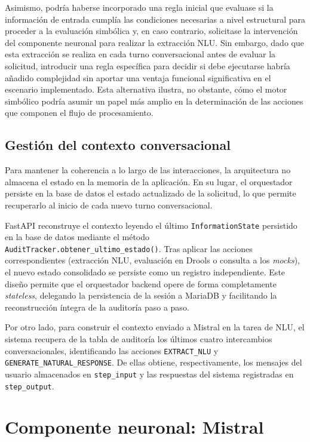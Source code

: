 \documentclass[12pt,a4paper]{report}
\begin{document}
Asimismo, podría haberse incorporado una regla inicial que evaluase si la información de entrada cumplía las condiciones necesarias a nivel estructural para proceder a la evaluación simbólica y, en caso contrario, solicitase la intervención del componente neuronal para realizar la extracción NLU. Sin embargo, dado que esta extracción se realiza en cada turno conversacional antes de evaluar la solicitud, introducir una regla específica para decidir si debe ejecutarse habría añadido complejidad sin aportar una ventaja funcional significativa en el escenario implementado. Esta alternativa ilustra, no obstante, cómo el motor simbólico podría asumir un papel más amplio en la determinación de las acciones que componen el flujo de procesamiento.

\subsection{Gestión del contexto conversacional}

Para mantener la coherencia a lo largo de las interacciones, la arquitectura no almacena el estado en la memoria de la aplicación. En su lugar, el orquestador persiste en la base de datos el estado actualizado de la solicitud, lo que permite recuperarlo al inicio de cada nuevo turno conversacional.

FastAPI reconstruye el contexto leyendo el último \texttt{InformationState} persistido en la base de datos mediante el método \texttt{AuditTracker.obtener\_ultimo\_estado()}. Tras aplicar las acciones correspondientes (extracción NLU, evaluación en Drools o consulta a los \textit{mocks}), el nuevo estado consolidado se persiste como un registro independiente. Este diseño permite que el orquestador backend opere de forma completamente \textit{stateless}, delegando la persistencia de la sesión a MariaDB y facilitando la reconstrucción íntegra de la auditoría paso a paso.

Por otro lado, para construir el contexto enviado a Mistral en la tarea de NLU, el sistema recupera de la tabla de auditoría los últimos cuatro intercambios conversacionales, identificando las acciones \texttt{EXTRACT\_NLU} y \texttt{GENERATE\_NATURAL\_RESPONSE}. De ellas obtiene, respectivamente, los mensajes del usuario almacenados en \texttt{step\_input} y las respuestas del sistema registradas en \texttt{step\_output}.

\section{Componente neuronal: Mistral}
\end{document}
